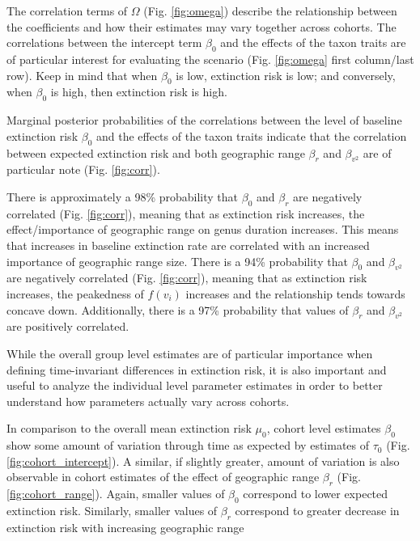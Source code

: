 \documentclass[12pt,letterpaper]{article}
\begin{document}
The correlation terms of \(\Omega\) (Fig. \ref{fig:omega}) describe the relationship between the coefficients and how their estimates may vary together across cohorts. The correlations between the intercept term \(\beta_{0}\) and the effects of the taxon traits are of particular interest for evaluating the \citet{Jablonski1986} scenario (Fig. \ref{fig:omega} first column/last row). Keep in mind that when \(\beta_{0}\) is low, extinction risk is low; and conversely, when \(\beta_{0}\) is high, then extinction risk is high.

Marginal posterior probabilities of the correlations between the level of baseline extinction risk \(\beta_{0}\) and the effects of the taxon traits indicate that the correlation between expected extinction risk and both geographic range \(\beta_{r}\) and \(\beta_{v^{2}}\) are of particular note (Fig. \ref{fig:corr}). 

There is approximately a 98\% probability that \(\beta_{0}\) and \(\beta_{r}\) are negatively correlated (Fig. \ref{fig:corr}), meaning that as extinction risk increases, the effect/importance of geographic range on genus duration increases. This means that increases in baseline extinction rate are correlated with an increased importance of geographic range size. There is a 94\% probability that \(\beta_{0}\) and \(\beta_{v^{2}}\) are negatively correlated (Fig. \ref{fig:corr}), meaning that as extinction risk increases, the peakedness of \(f(v_{i})\) increases and the relationship tends towards concave down. Additionally, there is a 97\% probability that values of \(\beta_{r}\) and \(\beta_{v^{2}}\) are positively correlated. 

While the overall group level estimates are of particular importance when defining time-invariant differences in extinction risk, it is also important and useful to analyze the individual level parameter estimates in order to better understand how parameters actually vary across cohorts.

In comparison to the overall mean extinction risk \(\mu_{0}\), cohort level estimates \(\beta_{0}\) show some amount of variation through time as expected by estimates of \(\tau_{0}\) (Fig. \ref{fig:cohort_intercept}). A similar, if slightly greater, amount of variation is also observable in cohort estimates of the effect of geographic range \(\beta_{r}\) (Fig. \ref{fig:cohort_range}). Again, smaller values of \(\beta_{0}\) correspond to lower expected extinction risk. Similarly, smaller values of \(\beta_{r}\) correspond to greater decrease in extinction risk with increasing geographic range 
\end{document}
